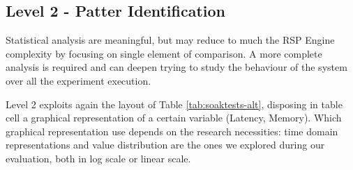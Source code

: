 \begin{table}[htbp]
	\caption{(a), (c) - memory results comparison between Incremental and Naive approaches; (b), (d) - results comparison between Graph-based and Triple-based models}
	\label{tab:soak_memory_comparisons}	
\end{table}


\subsection{Level 2 - Patter Identification}\label{sec:eval-level2}

Statistical analysis are meaningful, but may reduce to much the RSP Engine complexity by focusing on single element of comparison. A more complete analysis is required and \name can deepen trying to study the behaviour of the system over all the experiment execution.

Level 2 exploits again the layout of Table \ref{tab:soaktests-alt}, disposing in table cell a graphical representation of a certain variable (Latency, Memory). Which graphical representation use depends on the research necessities: time domain representations and value distribution are the ones we explored during our evaluation, both in log scale or linear scale.

